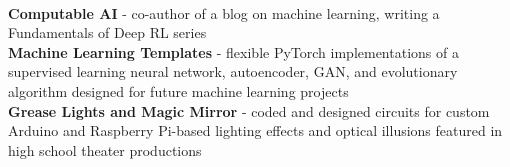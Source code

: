 \documentclass{article}
\begin{document}
\begin{center}
\begin{flushleft}
    {\large\textbf{\underline{}}} \\
    \textbf{Computable AI} - co-author of a blog on machine learning, writing a Fundamentals of Deep RL series \\
    \textbf{Machine Learning Templates} - flexible PyTorch implementations of a supervised learning neural network, autoencoder, GAN, and evolutionary algorithm designed for future machine learning projects \\
    \textbf{Grease Lights and Magic Mirror} - coded and designed circuits for custom Arduino and Raspberry Pi-based lighting effects and optical illusions featured in high school theater productions


  \end{flushleft}
  \end{center}
\end{document}
